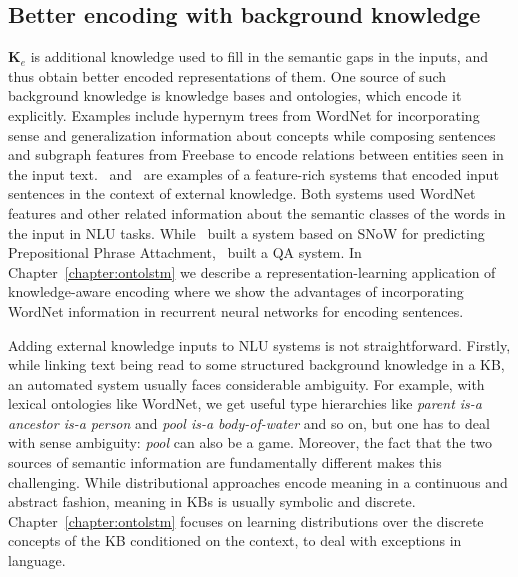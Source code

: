 \subsection{Better encoding with background knowledge}
$\mathbf{K}_e$ is additional knowledge used to fill in the semantic gaps in the inputs, and thus obtain better
encoded representations of them. One source of such background knowledge is knowledge bases and ontologies, which encode
it explicitly. Examples include hypernym trees from WordNet for incorporating sense and generalization information about
concepts while composing sentences and subgraph features from Freebase to encode relations
between entities seen in the input text.~\cite{moldovan2001logic} and~\cite{krymolowski1998incorporating} are examples of a feature-rich systems that encoded input sentences in the 
context of external knowledge. Both systems used WordNet features and other related information about the semantic classes of the words in the input in NLU tasks. While~\cite{krymolowski1998incorporating} 
built a system based on SNoW \citep{CCRR99} for predicting Prepositional Phrase Attachment,~\cite{moldovan2001logic} built a QA system. In Chapter~\ref{chapter:ontolstm} we describe
a representation-learning application of knowledge-aware encoding where we show the advantages of incorporating WordNet information in recurrent neural networks for encoding sentences.

Adding external knowledge inputs to NLU systems is not straightforward.  Firstly, while linking text being read to some structured background knowledge
in a KB, an automated system usually faces considerable ambiguity. For example, with lexical ontologies like WordNet, 
we get useful type hierarchies like \textit{parent is-a ancestor is-a person} and \textit{pool is-a body-of-water} 
and so on, but one has to deal with sense ambiguity: \textit{pool} can also be a game. Moreover, the fact that the two sources of semantic information are fundamentally different 
makes this challenging. While distributional approaches encode meaning in a
continuous and abstract fashion, meaning in KBs is usually symbolic and discrete. Chapter~\ref{chapter:ontolstm} focuses on learning 
distributions over the discrete concepts of the KB conditioned on the context, to deal with exceptions in language.

